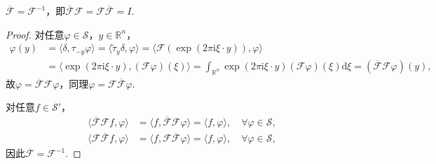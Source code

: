 \documentclass[../../main.tex]{subfiles}%
\begin{document}
\begin{theorem}
$\overline{\mathscr{F}}=\mathscr{F}^{-1}$，即$\overline{\mathscr{F}}\mathscr{F}=\mathscr{F}\overline{\mathscr{F}}=I$.
\end{theorem}
\begin{proof}

对任意$\varphi\in\mathscr{S}$，$y\in\mathbb{R}^n$，
\begin{align*}
\varphi(y)&=\langle\delta,\tau_{-y}\varphi\rangle=\langle\widetilde{\tau}_y\delta,\varphi\rangle
=\langle\mathscr{F}(\exp(2\pi\mathrm{i}\xi\cdot y)),\varphi\rangle\\
&=\langle\exp(2\pi\mathrm{i}\xi\cdot y),(\mathscr{F}\varphi)(\xi)\rangle
=\int_{\mathbb{R}^n}\exp(2\pi\mathrm{i}\xi\cdot y)(\mathscr{F}\varphi)(\xi)\mathrm{d}\xi=(\overline{\mathscr{F}}\mathscr{F}\varphi)(y),
\end{align*}
故$\varphi=\overline{\mathscr{F}}\mathscr{F}\varphi$，同理$\varphi=\mathscr{F}\overline{\mathscr{F}}\varphi$.

对任意$f\in\mathscr{S}'$，
\begin{align*}
\langle\overline{\mathscr{F}}\mathscr{F}f,\varphi\rangle&=\langle f,\overline{\mathscr{F}}\mathscr{F}\varphi\rangle=\langle f,\varphi\rangle,\quad \forall\varphi\in\mathscr{S},\\
\langle\mathscr{F}\overline{\mathscr{F}}f,\varphi\rangle&=\langle f,\mathscr{F}\overline{\mathscr{F}}\varphi\rangle=\langle f,\varphi\rangle,\quad \forall\varphi\in\mathscr{S},
\end{align*}
因此$\overline{\mathscr{F}}=\mathscr{F}^{-1}$.

\end{proof}
\end{document}
